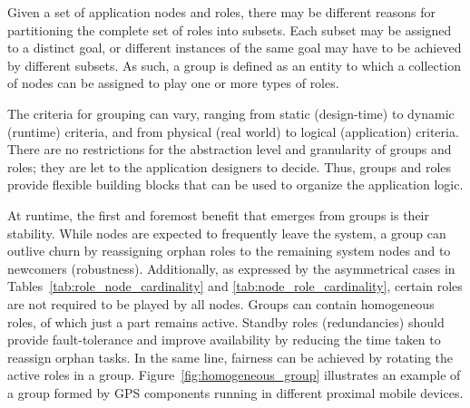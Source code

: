 

Given a set of application nodes and roles, there may be different reasons for partitioning the complete set of roles into subsets. Each subset may be assigned to a distinct goal, or different instances of the same goal may have to be achieved by different subsets. As such, a group is defined as an entity to which a collection of nodes can be assigned to play one or more types of roles. 

The criteria for grouping can vary, ranging from static (design-time) to dynamic (runtime) criteria, and from physical (real world) to logical (application) criteria. There are no restrictions for the abstraction level and granularity of groups and roles; they are let to the application designers to decide. Thus, groups and roles provide flexible building blocks that can be used to organize the application logic.



At runtime, the first and foremost benefit that emerges from groups is their stability. While nodes are expected to frequently leave the system, a group can outlive churn by reassigning orphan roles to the remaining system nodes and to newcomers (robustness). 
Additionally, as expressed by the asymmetrical cases in Tables~\ref{tab:role_node_cardinality} and \ref{tab:node_role_cardinality}, certain roles are not required to be played by all nodes. Groups can contain homogeneous roles, of which just a part remains active. Standby roles (redundancies) should provide fault-tolerance and improve availability by reducing the time taken to reassign orphan tasks. In the same line, fairness can be achieved by rotating the active roles in a group.
Figure~\ref{fig:homogeneous_group} illustrates an example of a group formed by GPS components running in different proximal mobile devices.

